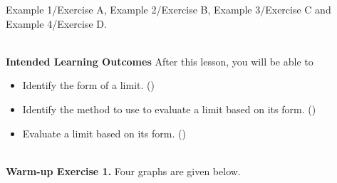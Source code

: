 \documentclass[10pt]{article}
\begin{document}
\core Example 1/Exercise A, Example 2/Exercise B, Example 3/Exercise C and Example 4/Exercise D.

\newpage
\hrulefill ~\\
\textbf{Intended Learning Outcomes}
After this lesson, you will be able to 

\begin{itemize}
    \item Identify the form of a limit. ()
    \item Identify the method to use to evaluate a limit based on its form. ()
    \item Evaluate a limit based on its form. ()
\end{itemize}

\vspace{-0.5cm}

\hrulefill
~\\
{\bf\color{blue}Warm-up Exercise 1.} Four graphs are given below.\\
\end{document}
